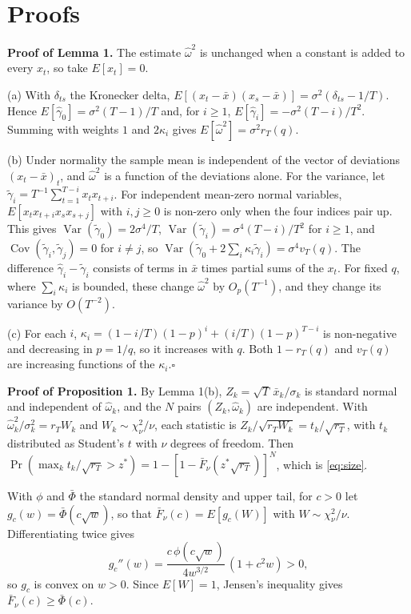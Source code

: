 \section{Proofs}
\label{app:proofs}

\noindent\textbf{Proof of Lemma 1.} The estimate $\hat\omega^2$ is unchanged when a constant is added to every $x_t$, so take $E[x_t]=0$.

(a) With $\delta_{ts}$ the Kronecker delta, $E[(x_t-\bar x)(x_s-\bar x)]=\sigma^2(\delta_{ts}-1/T)$. Hence $E[\hat\gamma_0]=\sigma^2(T-1)/T$ and, for $i\ge1$, $E[\hat\gamma_i]=-\sigma^2(T-i)/T^2$. Summing with weights $1$ and $2\kappa_i$ gives $E[\hat\omega^2]=\sigma^2 r_T(q)$.

(b) Under normality the sample mean is independent of the vector of deviations $(x_t-\bar x)_t$, and $\hat\omega^2$ is a function of the deviations alone. For the variance, let $\tilde\gamma_i=T^{-1}\sum_{t=1}^{T-i}x_tx_{t+i}$. For independent mean-zero normal variables, $E[x_tx_{t+i}x_sx_{s+j}]$ with $i,j\ge0$ is non-zero only when the four indices pair up. This gives $\operatorname{Var}(\tilde\gamma_0)=2\sigma^4/T$, $\operatorname{Var}(\tilde\gamma_i)=\sigma^4(T-i)/T^2$ for $i\ge1$, and $\operatorname{Cov}(\tilde\gamma_i,\tilde\gamma_j)=0$ for $i\ne j$, so $\operatorname{Var}(\tilde\gamma_0+2\sum_i\kappa_i\tilde\gamma_i)=\sigma^4v_T(q)$. The difference $\hat\gamma_i-\tilde\gamma_i$ consists of terms in $\bar x$ times partial sums of the $x_t$. For fixed $q$, where $\sum_i\kappa_i$ is bounded, these change $\hat\omega^2$ by $O_p(T^{-1})$, and they change its variance by $O(T^{-2})$.

(c) For each $i$, $\kappa_i=(1-i/T)(1-p)^i+(i/T)(1-p)^{T-i}$ is non-negative and decreasing in $p=1/q$, so it increases with $q$. Both $1-r_T(q)$ and $v_T(q)$ are increasing functions of the $\kappa_i$.\hfill$\square$

\medskip\noindent\textbf{Proof of Proposition 1.} By Lemma 1(b), $Z_k=\sqrt T\,\bar x_k/\sigma_k$ is standard normal and independent of $\hat\omega_k$, and the $N$ pairs $(Z_k,\hat\omega_k)$ are independent. With $\hat\omega_k^2/\sigma_k^2=r_TW_k$ and $W_k\sim\chi^2_\nu/\nu$, each statistic is $Z_k/\sqrt{r_TW_k}=t_k/\sqrt{r_T}$, with $t_k$ distributed as Student's $t$ with $\nu$ degrees of freedom. Then $\Pr(\max_kt_k/\sqrt{r_T}>z^*)=1-[1-\bar F_\nu(z^*\sqrt{r_T})]^N$, which is \eqref{eq:size}.

With $\phi$ and $\bar\Phi$ the standard normal density and upper tail, for $c>0$ let $g_c(w)=\bar\Phi(c\sqrt w)$, so that $\bar F_\nu(c)=E[g_c(W)]$ with $W\sim\chi^2_\nu/\nu$. Differentiating twice gives
\[
g_c''(w)=\frac{c\,\phi(c\sqrt w)}{4w^{3/2}}\,(1+c^2w)>0,
\]
so $g_c$ is convex on $w>0$. Since $E[W]=1$, Jensen's inequality gives $\bar F_\nu(c)\ge\bar\Phi(c)$.

